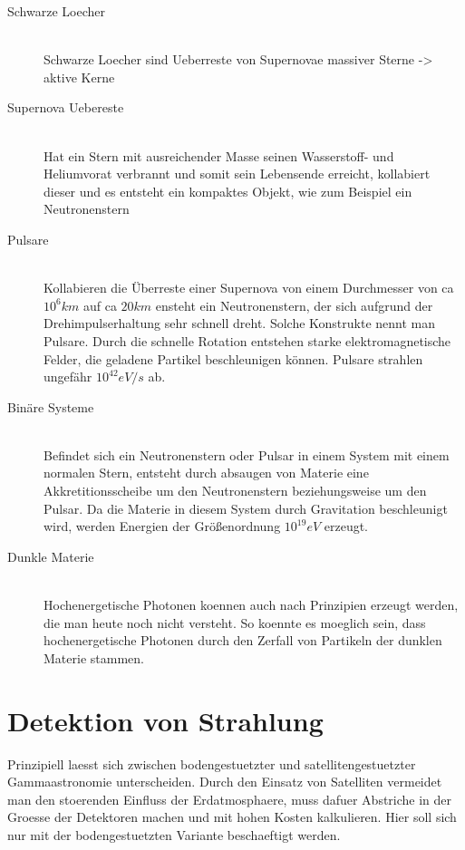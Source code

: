 \begin{description}
\item[Schwarze Loecher]\hfill \\
Schwarze Loecher sind Ueberreste von Supernovae massiver Sterne -> aktive Kerne
\item[Supernova Uebereste]\hfill \\
Hat ein Stern mit ausreichender Masse seinen Wasserstoff- und Heliumvorat verbrannt und somit sein Lebensende erreicht, kollabiert dieser und es entsteht ein kompaktes Objekt, wie zum Beispiel ein Neutronenstern
\item[Pulsare]\hfill \\
Kollabieren die Überreste einer Supernova von einem Durchmesser von ca $10^6km$ auf ca $20km$ ensteht ein Neutronenstern, der sich aufgrund der Drehimpulserhaltung sehr schnell dreht. Solche Konstrukte nennt man Pulsare. Durch die schnelle Rotation entstehen starke elektromagnetische Felder, die geladene Partikel beschleunigen können. Pulsare strahlen ungefähr $10^42eV/s$ ab.
\item[Binäre Systeme]\hfill \\ 
Befindet sich ein Neutronenstern oder Pulsar in einem System mit einem normalen Stern, entsteht durch absaugen von Materie eine Akkretitionsscheibe um den Neutronenstern beziehungsweise um den Pulsar. Da die Materie in diesem System durch Gravitation beschleunigt wird, werden Energien der Größenordnung $10^19 eV$ erzeugt. 
\item[Dunkle Materie]\hfill \\
Hochenergetische Photonen koennen auch nach Prinzipien erzeugt werden, die man heute noch nicht versteht. So koennte es moeglich sein, dass hochenergetische Photonen durch den Zerfall von Partikeln der dunklen Materie stammen. %
\end{description}


\section{Detektion von Strahlung}
Prinzipiell laesst sich zwischen bodengestuetzter und satellitengestuetzter Gammaastronomie unterscheiden. Durch den Einsatz von Satelliten vermeidet man den stoerenden Einfluss der Erdatmosphaere, muss dafuer Abstriche in der Groesse der Detektoren machen und mit hohen Kosten kalkulieren. Hier soll sich nur mit der bodengestuetzten Variante beschaeftigt werden.

